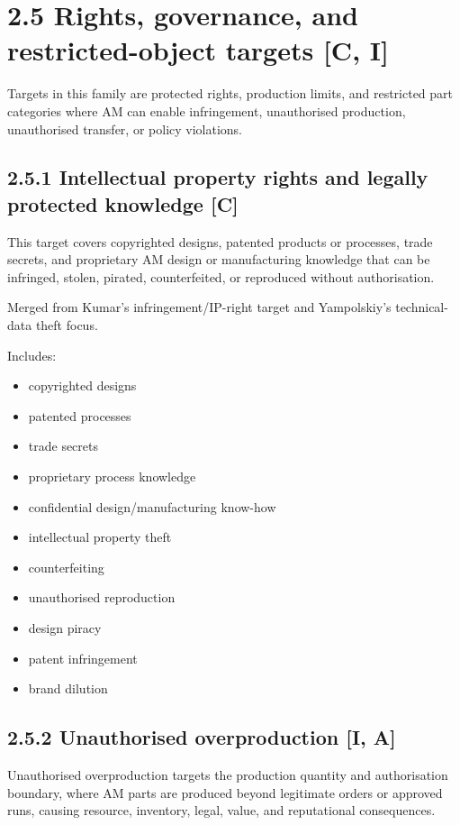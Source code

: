 \documentclass[10pt,a4paper,oneside]{report}
\begin{document}
\section{2.5 Rights, governance, and restricted-object targets [C, I]}


Targets in this family are protected rights, production limits, and restricted part categories where AM can enable infringement, unauthorised production, unauthorised transfer, or policy violations.


\subsection{2.5.1 Intellectual property rights and legally protected knowledge [C]}


This target covers copyrighted designs, patented products or processes, trade secrets, and proprietary AM design or manufacturing knowledge that can be infringed, stolen, pirated, counterfeited, or reproduced without authorisation.

Merged from Kumar's infringement/IP-right target and Yampolskiy's technical-data theft focus.

Includes:

\begin{itemize}
\item copyrighted designs
\item patented processes
\item trade secrets
\item proprietary process knowledge
\item confidential design/manufacturing know-how
\item intellectual property theft
\item counterfeiting
\item unauthorised reproduction
\item design piracy
\item patent infringement
\item brand dilution
\end{itemize}


\subsection{2.5.2 Unauthorised overproduction [I, A]}


Unauthorised overproduction targets the production quantity and authorisation boundary, where AM parts are produced beyond legitimate orders or approved runs, causing resource, inventory, legal, value, and reputational consequences.
\end{document}
